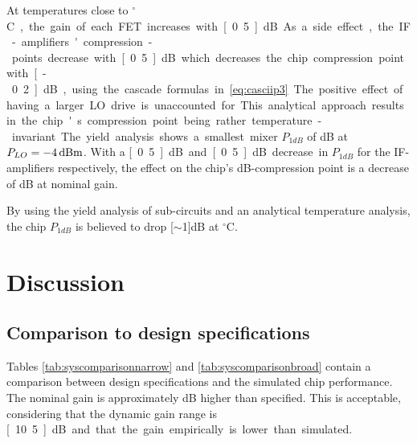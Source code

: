 			At temperatures close to \unit[-40]{$^\circ$C}, the gain of each FET increases with \unit[0.5]{dB}. As a side effect, the IF-amplifiers' compression-points decrease with \unit[0.5]{dB} which decreases the chip compression point with \unit[-0.2]{dB}, using the cascade formulas in \autoref{eq:casciip3}. The positive effect of having a larger LO drive is unaccounted for.	This analytical approach results in the chip's compression point being rather temperature-invariant. The yield analysis shows a smallest mixer $P_{1dB}$ of \unit[10]{dB} at $P_{LO}=\unit[-4]{dBm}$. With a \unit[0.5]{dB} and \unit[0.5]{dB} decrease in $P_{1dB}$ for the IF-amplifiers respectively, the effect on the chip's \unit[1]{dB}-compression point is a decrease of \unit[1]{dB} at nominal gain.
		
			By using the yield analysis of sub-circuits and an analytical temperature analysis, the chip $P_{1dB}$ is believed to drop \unit[$\sim$1]{dB} at \unit[-40]{$^\circ$C}.

	
	\section{Discussion}
		\subsection{Comparison to design specifications}
			Tables \ref{tab:syscomparisonnarrow} and \ref{tab:syscomparisonbroad} contain a comparison between design specifications and the simulated chip performance. The nominal gain is approximately \unit[1]{dB} higher than specified. This is acceptable, considering that the dynamic gain range is \unit[10.5]{dB} and that the gain empirically is lower than simulated.
			
